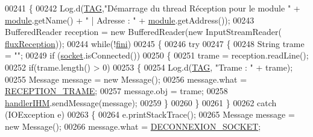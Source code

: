 \begin{DoxyCode}
00241         \{
00242             Log.d(\hyperlink{classcom_1_1example_1_1area_1_1_liaison_bluetooth_ac51aa4b63fae5c36734a061cc05d7fc9}{TAG},\textcolor{stringliteral}{"Démarrage du thread Réception pour le module "} + 
      \hyperlink{classcom_1_1example_1_1area_1_1_liaison_bluetooth_a80068a7178f6c84eae7bab50cf0a784a}{module}.getName() + \textcolor{stringliteral}{" | Adresse : "} + \hyperlink{classcom_1_1example_1_1area_1_1_liaison_bluetooth_a80068a7178f6c84eae7bab50cf0a784a}{module}.getAddress());
00243             BufferedReader reception = \textcolor{keyword}{new} BufferedReader(\textcolor{keyword}{new} InputStreamReader(
      \hyperlink{classcom_1_1example_1_1area_1_1_liaison_bluetooth_a9a3a7d77bae06a972782b6e73471878d}{fluxReception}));
00244             \textcolor{keywordflow}{while}(!\hyperlink{classcom_1_1example_1_1area_1_1_liaison_bluetooth_1_1_t_reception_a7f942e7af3e97af754f2591d2bd20435}{fini})
00245             \{
00246                 \textcolor{keywordflow}{try}
00247                 \{
00248                     String trame = \textcolor{stringliteral}{""};
00249                     \textcolor{keywordflow}{if} (\hyperlink{classcom_1_1example_1_1area_1_1_liaison_bluetooth_ab59b57f5e59d0236e49ecf68c053cb27}{socket}.isConnected())
00250                     \{
00251                         trame = reception.readLine();
00252                         \textcolor{keywordflow}{if}(trame.length() > 0)
00253                         \{
00254                           Log.d(\hyperlink{classcom_1_1example_1_1area_1_1_liaison_bluetooth_ac51aa4b63fae5c36734a061cc05d7fc9}{TAG}, \textcolor{stringliteral}{"Trame : "} + trame);
00255                           Message message = \textcolor{keyword}{new} Message();
00256                           message.what = \hyperlink{classcom_1_1example_1_1area_1_1_liaison_bluetooth_a1a3058c683cec15fe0f3699f7fc26073}{RECEPTION\_TRAME};
00257                           message.obj = trame;
00258                           \hyperlink{classcom_1_1example_1_1area_1_1_liaison_bluetooth_ace2c20759fc96d3ae787f1f726fd2691}{handlerIHM}.sendMessage(message);
00259                         \}
00260                     \}
00261                 \}
00262                 \textcolor{keywordflow}{catch} (IOException e)
00263                 \{
00264                     e.printStackTrace();
00265                     Message message = \textcolor{keyword}{new} Message();
00266                     message.what = \hyperlink{classcom_1_1example_1_1area_1_1_liaison_bluetooth_a8ff08468d7b2cead9c3714c665f75d0e}{DECONNEXION\_SOCKET};

\end{DoxyCode}
